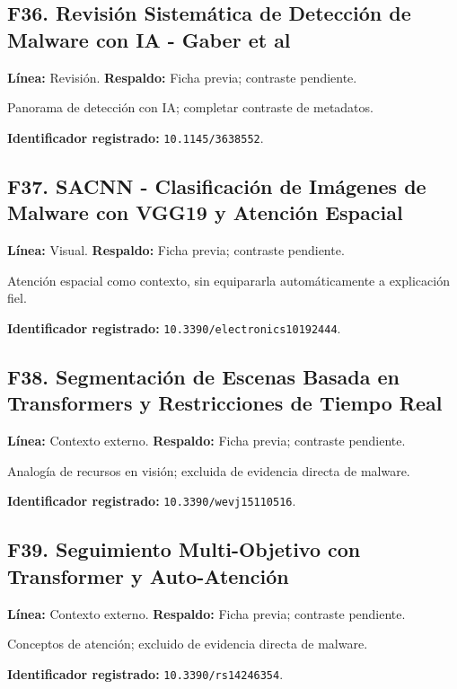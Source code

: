 \begin{samepage}
\subsection*{F36. Revisión Sistemática de Detección de Malware con IA - Gaber et al}
\noindent\textbf{Línea:} Revisión. \textbf{Respaldo:} Ficha previa; contraste pendiente. 

Panorama de detección con IA; completar contraste de metadatos.

\noindent\textbf{Identificador registrado:} \nolinkurl{10.1145/3638552}.

\end{samepage}
\begin{samepage}
\subsection*{F37. SACNN - Clasificación de Imágenes de Malware con VGG19 y Atención Espacial}
\noindent\textbf{Línea:} Visual. \textbf{Respaldo:} Ficha previa; contraste pendiente. 

Atención espacial como contexto, sin equipararla automáticamente a explicación fiel.

\noindent\textbf{Identificador registrado:} \nolinkurl{10.3390/electronics10192444}.

\end{samepage}
\begin{samepage}
\subsection*{F38. Segmentación de Escenas Basada en Transformers y Restricciones de Tiempo Real}
\noindent\textbf{Línea:} Contexto externo. \textbf{Respaldo:} Ficha previa; contraste pendiente. 

Analogía de recursos en visión; excluida de evidencia directa de malware.

\noindent\textbf{Identificador registrado:} \nolinkurl{10.3390/wevj15110516}.

\end{samepage}
\begin{samepage}
\subsection*{F39. Seguimiento Multi-Objetivo con Transformer y Auto-Atención}
\noindent\textbf{Línea:} Contexto externo. \textbf{Respaldo:} Ficha previa; contraste pendiente. 

Conceptos de atención; excluido de evidencia directa de malware.

\noindent\textbf{Identificador registrado:} \nolinkurl{10.3390/rs14246354}.

\end{samepage}
